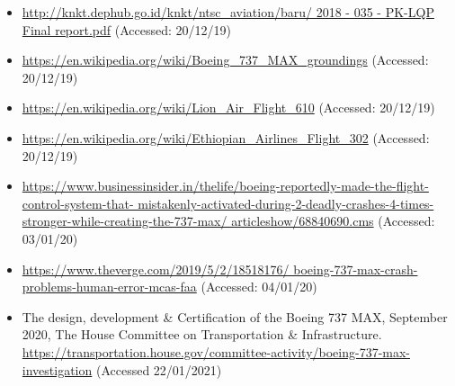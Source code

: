 
\begin{itemize}
    \item \raggedright{\href{http://knkt.dephub.go.id/knkt/ntsc\_aviation/baru/2018\%20-\%20035\%20-\%20PK-LQP\%20Final\%20report.pdf}{http://knkt.dephub.go.id/knkt/ntsc\_aviation/baru/ 2018 - 035 - PK-LQP Final report.pdf} (Accessed: 20/12/19)}
    \item \raggedright{\href{https://en.wikipedia.org/wiki/Boeing\_737\_MAX\_groundings}{https://en.wikipedia.org/wiki/Boeing\_737\_MAX\_groundings} (Accessed: 20/12/19)}
    \item \raggedright{\href{https://en.wikipedia.org/wiki/Lion\_Air\_Flight\_610}{https://en.wikipedia.org/wiki/Lion\_Air\_Flight\_610} (Accessed: 20/12/19)}
    \item \raggedright{\href{https://en.wikipedia.org/wiki/Ethiopian\_Airlines\_Flight\_302}{https://en.wikipedia.org/wiki/Ethiopian\_Airlines\_Flight\_302}  (Accessed: 20/12/19)}
    \item \raggedright{\href{https://www.businessinsider.in/thelife/boeing-reportedly-made-the-flight-control-system-that-mistakenly-activated-during-2-deadly-crashes-4-times-stronger-while-creating-the-737-max/articleshow/68840690.cms}{https://www.businessinsider.in/thelife/boeing-reportedly-made-the-flight-control-system-that- mistakenly-activated-during-2-deadly-crashes-4-times-stronger-while-creating-the-737-max/ articleshow/68840690.cms} (Accessed: 03/01/20)}
    \item \raggedright{\href{https://www.theverge.com/2019/5/2/18518176/boeing-737-max-crash-problems-human-error-mcas-faa}{https://www.theverge.com/2019/5/2/18518176/ boeing-737-max-crash-problems-human-error-mcas-faa} (Accessed: 04/01/20)}
    \item The design, development \& Certification of the Boeing 737 MAX, September 2020, The House Committee on Transportation \& Infrastructure. \href{https://transportation.house.gov/committee-activity/boeing-737-max-investigation}{https://transportation.house.gov/committee-activity/boeing-737-max-investigation} (Accessed 22/01/2021)
\end{itemize}

%
%
